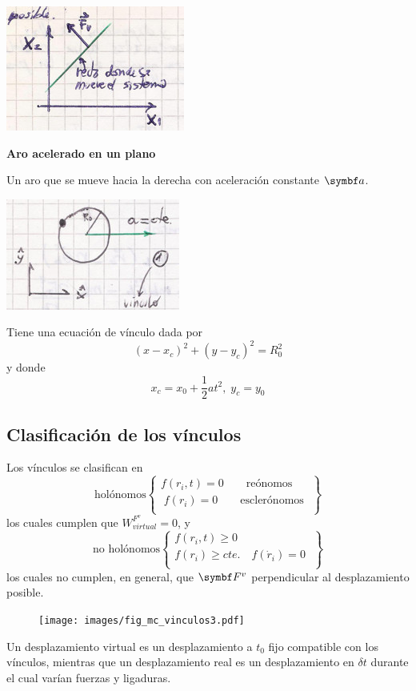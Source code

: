 \documentclass[10pt,oneside]{CBFT_book}
\begin{document}
\includegraphics[scale=0.35]{images/fig_mc_problema_bloques_fases.jpg}

\begin{ejemplo}{\bf Aro acelerado en un plano}

Un aro que se mueve hacia la derecha con aceleración constante $\vb{a}$.

\includegraphics[scale=0.25]{images/fig_mc_aro_acelerado.jpg}

Tiene una ecuación de vínculo dada por
\[
	(x-x_c)^2 + (y-y_c)^2 = R_0^2
\]
y donde
\[
	x_c = x_0 + \frac 1 2 a t^2, \; y_c = y_0
\]
\end{ejemplo}

\subsection{Clasificación de los vínculos}

Los vínculos se clasifican en
\[
\textrm{holónomos}
\begin{Bmatrix}
 f(r_i,t) = 0 \qquad \textrm{reónomos} \\
\; f(r_i) = 0 \qquad \textrm{esclerónomos} \;\\
\end{Bmatrix}
\]
los cuales cumplen que  $W_{virtual}^{F^v}=0$, y
\[
\textrm{no holónomos}
\begin{Bmatrix}
 f(r_i,t) \geq 0  \\
 f(r_i) \geq cte. \quad f(\dot{r}_i) = 0  \; \\
\end{Bmatrix}
\]
los cuales no cumplen, en general, que $\vb{F}^v$ perpendicular al desplazamiento posible.

\begin{figure}[!hbt]
	\begin{center}
	\texttt{[image: images/fig\_mc\_vinculos3.pdf]}
	\end{center}
	\caption{}
\end{figure}
Un desplazamiento virtual es un desplazamiento a $t_0$ fijo compatible con los vínculos,
mientras que un desplazamiento real es un desplazamiento en $\delta t$ durante el cual varían
fuerzas y ligaduras.
\end{document}
